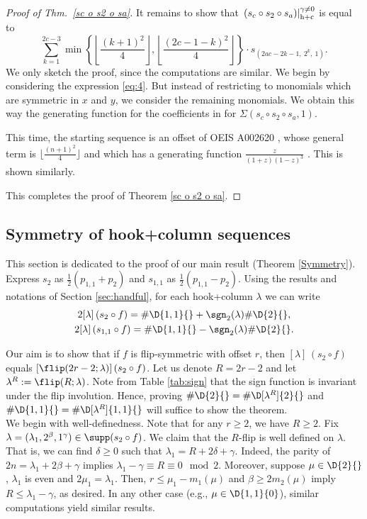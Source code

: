 \documentclass[twoside]{article}
\renewcommand{\hcN}[1]{\left.\left(#1\right)\right|_{\textnormal{h+c}}^{\gamma\ne0}}
\begin{document}
\begin{proof}[Proof of Thm.~\ref{sc o s2 o sa}]
It remains to show that $\hcN{s_c\circ s_2\circ s_a} $ 
is equal to
\[
\sum\limits_{k=1}^{2c-3}\min\left\{\left\lfloor\frac{(k+1)^2}{4}\right\rfloor,\left\lfloor\frac{(2c-1-k)^2}{4}\right\rfloor\right\}\cdot s_{(2ac-2k-1,\ 2^k,\ 1)}.
\]
We only sketch the proof, since the computations are similar. We begin by considering the expression \eqref{eq:4}. But instead of restricting to monomials which are symmetric in $x$ and $y$, we consider the remaining monomials. We obtain this way the generating function for the coefficients in for $\Sigma(s_c\circ s_2\circ s_a,1)$.

This time, the starting sequence is an offset of OEIS A002620 \cite{oeis}, whose general term is $\big\lfloor\frac{(n+1)^2}{4}\big\rfloor$ and which has a generating function $\frac{z}{(1+z)(1-z)^3}$ \cite{plouffe}. This is shown similarly.

This completes the proof of Theorem \ref{sc o s2 o sa}.
\end{proof}







\subsection{Symmetry of hook+column sequences}\label{sec:symmetry}

This section is dedicated to the proof of our main result (Theorem \ref{Symmetry}). Express $s_2$ as $\frac{1}{2}(p_{1,1}+p_2)$ and $s_{1,1}$ as $\frac{1}{2}(p_{1,1}-p_2)$. Using the results and notations of Section \ref{sec:handful}, for each hook+column $\lambda$ we can write 
\begin{gather*}
    2[\lambda]\, (s_2\circ  f)=\#\D{1,1}{} + \sgn_2(\lambda)\#\D{2}{},\\
    2[\lambda] \, (s_{1,1}\circ  f)=\#\D{1,1}{} - \sgn_2(\lambda)\#\D{2}{}.
\end{gather*}

Our aim is to show that if $f$ is flip-symmetric with offset $r$, then $[\lambda] \, (s_2\circ f)$ equals $[\flip(2r-2; \lambda)]\, (s_2\circ f)$. Let us denote $R=2r-2$ and let $\lambda^R := \flip(R; \lambda)$. Note from Table \ref{tab:sign} that the sign function is invariant under the flip involution.
Hence, proving $\#\D{2}{} = \#\D[\lambda^R]{2}{}$ and $\#\D{1,1}{} = \#\D[\lambda^R]{1,1}{}$ will suffice to show the theorem.\\

We begin with well-definedness. Note that for any $r\ge2$, we have $R\ge2$. Fix $\lambda = (\lambda_1, 2^\beta, 1^\gamma)\in\supp(s_2\circ f)$. We claim that the $R$-flip is well defined on $\lambda$. That is, we can find $\delta\ge0$ such that $\lambda_1 = R+2\delta+\gamma$. Indeed, the parity of $2n = \lambda_1+2\beta+\gamma$ implies $\lambda_1-\gamma\equiv R\equiv0 \mod 2$. Moreover, suppose $\mu\in\D{2}{}$, $\lambda_1$ is even and $2\mu_1=\lambda_1$. Then, $r\le\mu_1-m_1(\mu)$ and $\beta\ge2m_2(\mu)$ imply $R\le\lambda_1-\gamma$, as desired. In any other case (e.g., $\mu\in\D{1,1}{0}$), similar computations yield similar results.
\end{document}
